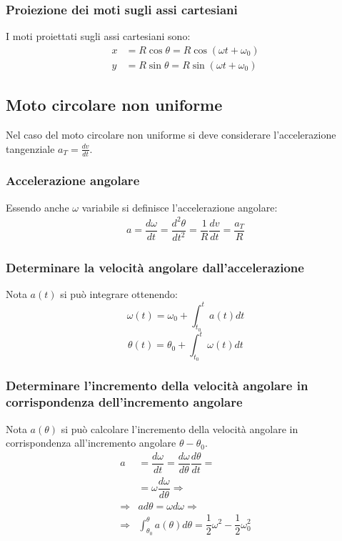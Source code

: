 \documentclass[class=book, crop=false, oneside, 12pt]{standalone}
\begin{document}
    \subsubsection{Proiezione dei moti sugli assi cartesiani}
    I moti proiettati sugli assi cartesiani sono:
    \begin{align}
      x&= R \cos \theta = R \cos (\omega t + \omega_0) \\
      y&= R \sin \theta = R \sin (\omega t + \omega_0)
    \end{align}
	\subsection{Moto circolare non uniforme}
	Nel caso del moto circolare non uniforme si deve considerare l'accelerazione tangenziale $a_T=\frac{dv}{dt}$.
		\subsubsection{Accelerazione angolare}
		Essendo anche $\omega$ variabile si definisce l'accelerazione angolare:
		\begin{align*}
			a=\dfrac{d\omega}{dt}=\dfrac{d^2\theta}{dt^2}=\dfrac{1}{R}\dfrac{dv}{dt}=\dfrac{a_T}{R}
		\end{align*}
		\subsubsection{Determinare la velocit\`a angolare dall'accelerazione}
		Nota $a(t)$ si pu\`o integrare ottenendo:
		$$\omega(t)=\omega_0+\int_{t_0}^ta(t)dt$$
		$$\theta(t)=\theta_0+\int_{t_0}^t\omega(t)dt$$
		\subsubsection{Determinare l'incremento della velocit\`a angolare in corrispondenza dell'incremento angolare}
		Nota $a(\theta)$ si pu\`o calcolare l'incremento della velocit\`a angolare in corrispondenza all'incremento angolare $\theta-\theta_0$.
		\begin{align*}
			a&=\dfrac{d\omega}{dt}=\dfrac{d\omega}{d\theta}\dfrac{d\theta}{dt}=\\
			 &=\omega\dfrac{d\omega}{d\theta}\Rightarrow\\
			\Rightarrow&ad\theta=\omega d\omega\Rightarrow\\
			\Rightarrow&\int_{\theta_0}^\theta a(\theta)d\theta=\dfrac{1}{2}\omega^2-\dfrac{1}{2}\omega_0^2
		\end{align*}
\end{document}
